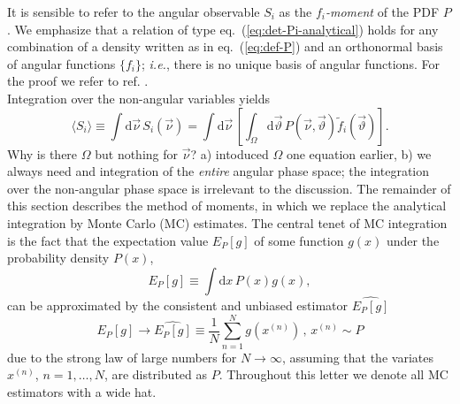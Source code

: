\documentclass[aps,nofootinbib,preprintnumbers,prd,twocolumn]{revtex4-1}
\newcommand{\dual}[1]{\tilde{#1}}
\newcommand{\est}[1]{\widehat{#1}}
\newcommand{\ie}{\textit{i.e.}}
\newcommand{\nuvec}{\vec{\nu}}
\newcommand{\refeq}[1]{eq.~(\ref{eq:#1})}
\newcommand{\rmdx}[1]{\mbox{d} #1 \,} %
\newcommand{\thvec}{\vec{\vartheta}}
\renewcommand{\theta}{\vartheta}
\newcommand{\danny}[1]{{\color{purple}#1}}
\newcommand{\fred}[1]{{\color{brown!85!black}#1}}
\begin{document}
It is sensible to refer to the angular observable $S_i$ as the
\emph{$f_i$-moment} of the PDF $P$.  We emphasize that a relation of
type \refeq{det-Pi-analytical} holds for any combination of a density
written as in \refeq{def-P} and an orthonormal basis of angular
functions $\lbrace f_i \rbrace$; \ie, there is no unique
basis of angular functions. For the proof we refer to ref. \cite{Dighe:1998vk}.\\

Integration over the non-angular variables yields
\begin{equation}
    \langle S_i\rangle
    \equiv \int \rmdx{\vec\nu} S_i(\nuvec)
    = \int \rmdx{\vec \nu} \left[\int_{\Omega} \rmdx{\vec \theta} P(\nuvec,\thvec) \dual{f}_i(\thvec) \right].
\end{equation}
\fred{Why is there $\Omega$ but nothing for $\nuvec$?}
\danny{a) intoduced $\Omega$ one equation earlier, b) we always need
and integration of the \emph{entire} angular phase space; the integration
over the non-angular phase space is irrelevant to the discussion.}
The remainder of this section describes the method of moments, in
which we replace the analytical integration by Monte Carlo (MC)
estimates.  The central tenet of MC integration is the fact that the
expectation value $E_P[g]$ of some function $g(x)$ under the
probability density $P(x)$,
\begin{equation}
    E_P[g] \equiv \int \rmdx{x} P(x) g(x),
\end{equation}
can be approximated by the consistent and unbiased
estimator $\est{E_P[g]}$~\cite[sec. 8.2]{James:2006zz}
\begin{equation}
    \label{eq:mc-id}
    E_P[g] \to \widehat{E_P[g]} \equiv \frac{1}{N} \sum_{n=1}^N g(x^{(n)}) \,,\,    x^{(n)} \sim P
\end{equation}
due to the strong law of large numbers for $N \to \infty$, assuming
that the variates $x^{(n)}$, $n = 1, \dots, N$, are distributed as
$P$.
Throughout this letter we denote all MC estimators with a wide hat.\\
\end{document}
